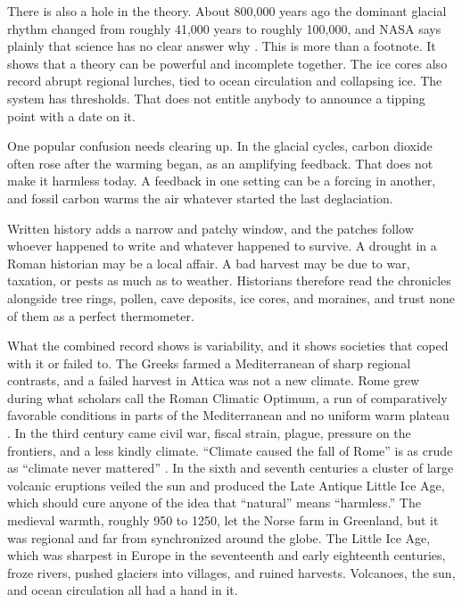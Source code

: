 \documentclass[12pt,a4paper]{book}
\begin{document}
There is also a hole in the theory. About 800,000 years ago the dominant glacial rhythm changed from roughly 41,000 years to roughly 100,000, and NASA says plainly that science has no clear answer why \cite{NASA2024Milankovitch}. This is more than a footnote. It shows that a theory can be powerful and incomplete together. The ice cores also record abrupt regional lurches, tied to ocean circulation and collapsing ice. The system has thresholds. That does not entitle anybody to announce a tipping point with a date on it.

One popular confusion needs clearing up. In the glacial cycles, carbon dioxide often rose after the warming began, as an amplifying feedback. That does not make it harmless today. A feedback in one setting can be a forcing in another, and fossil carbon warms the air whatever started the last deglaciation.

Written history adds a narrow and patchy window, and the patches follow whoever happened to write and whatever happened to survive. A drought in a Roman historian may be a local affair. A bad harvest may be due to war, taxation, or pests as much as to weather. Historians therefore read the chronicles alongside tree rings, pollen, cave deposits, ice cores, and moraines, and trust none of them as a perfect thermometer.

What the combined record shows is variability, and it shows societies that coped with it or failed to. The Greeks farmed a Mediterranean of sharp regional contrasts, and a failed harvest in Attica was not a new climate. Rome grew during what scholars call the Roman Climatic Optimum, a run of comparatively favorable conditions in parts of the Mediterranean and no uniform warm plateau \cite{McCormick2012,Neukom2019}. In the third century came civil war, fiscal strain, plague, pressure on the frontiers, and a less kindly climate. ``Climate caused the fall of Rome'' is as crude as ``climate never mattered'' \cite{McCormick2012,Harper2017}. In the sixth and seventh centuries a cluster of large volcanic eruptions veiled the sun and produced the Late Antique Little Ice Age, which should cure anyone of the idea that ``natural'' means ``harmless.'' The medieval warmth, roughly 950 to 1250, let the Norse farm in Greenland, but it was regional and far from synchronized around the globe. The Little Ice Age, which was sharpest in Europe in the seventeenth and early eighteenth centuries, froze rivers, pushed glaciers into villages, and ruined harvests. Volcanoes, the sun, and ocean circulation all had a hand in it.
\end{document}
